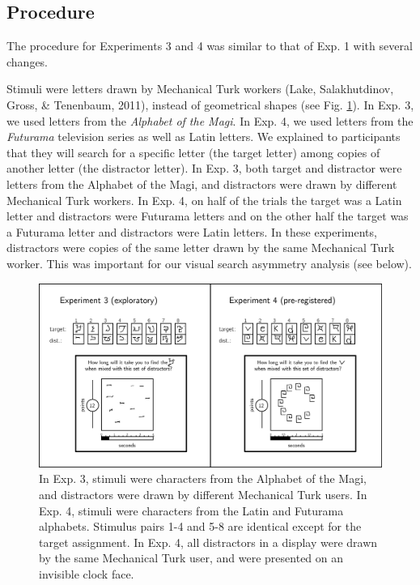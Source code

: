 \documentclass[12pt,twoside]{reedthesis}
\begin{document}
\hypertarget{procedure-3}{%
\subsection{Procedure}\label{procedure-3}}

The procedure for Experiments 3 and 4 was similar to that of Exp. 1 with several changes.

Stimuli were letters drawn by Mechanical Turk workers (Lake, Salakhutdinov, Gross, \& Tenenbaum, 2011), instead of geometrical shapes (see Fig. \ref{fig:MVS-methods2}). In Exp. 3, we used letters from the \emph{Alphabet of the Magi}. In Exp. 4, we used letters from the \emph{Futurama} television series as well as Latin letters. We explained to participants that they will search for a specific letter (the target letter) among copies of another letter (the distractor letter). In Exp. 3, both target and distractor were letters from the Alphabet of the Magi, and distractors were drawn by different Mechanical Turk workers. In Exp. 4, on half of the trials the target was a Latin letter and distractors were Futurama letters and on the other half the target was a Futurama letter and distractors were Latin letters. In these experiments, distractors were copies of the same letter drawn by the same Mechanical Turk worker. This was important for our visual search asymmetry analysis (see below).
\begin{figure}

{\centering \includegraphics[width=1\linewidth]{figure/MVS/methods2} 

}

\caption[Experimental design for Experiments 3 and 4.]{In Exp. 3, stimuli were characters from the Alphabet of the Magi, and distractors were drawn by different Mechanical Turk users. In Exp. 4, stimuli were characters from the Latin and Futurama alphabets. Stimulus pairs 1-4 and 5-8 are identical except for the target assignment. In Exp. 4, all distractors in a display were drawn by the same Mechanical Turk user, and were presented on an invisible clock face.}\label{fig:MVS-methods2}
\end{figure}
\end{document}
